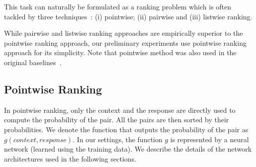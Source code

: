\documentclass{article} \usepackage{nips15submit_e,times}
\begin{document}
This task can naturally be formulated as a ranking problem which is often tackled by three techniques~\cite{liu2009learning}: (i) pointwise; (ii) pairwise and (iii) listwise ranking.

While pairwise and listwise ranking approaches are empirically superior to the pointwise ranking approach, our preliminary experiments use pointwise ranking approach for its simplicity. Note that pointwise method was also used in the original baselines~\cite{lowe2015ubuntu}.

\subsection{Pointwise Ranking}

In pointwise ranking, only the context and the response are directly used to compute the probability of the pair. All the pairs are then sorted by their probabilities. 
We denote the function that outputs the probability of the pair as $g(context, response)$.
In our settings, the function $g$ is represented by a neural network (learned using the training data).
We describe the details of the network architectures used in the following sections.
\end{document}
